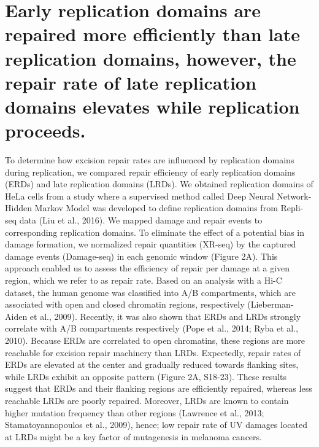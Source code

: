 \section{Early replication domains are repaired more efficiently than late replication domains, however, the repair rate of late replication domains elevates while replication proceeds.}

To determine how excision repair rates are influenced by replication domains during replication, we compared repair efficiency of early replication domains (ERDs) and late replication domains (LRDs). We obtained replication domains of HeLa cells from a study where a supervised method called Deep Neural Network-Hidden Markov Model was developed to define replication domains from Repli-seq data (Liu et al., 2016). We mapped damage and repair events to corresponding replication domains. To eliminate the effect of a potential bias in damage formation, we normalized repair quantities (XR-seq) by the captured damage events (Damage-seq) in each genomic window (Figure 2A). This approach enabled us to assess the efficiency of repair per damage at a given region, which we refer to as repair rate. Based on an analysis with a Hi-C dataset, the human genome was classified into A/B compartments, which are associated with open and closed chromatin regions, respectively (Lieberman-Aiden et al., 2009). Recently, it was also shown that ERDs and LRDs strongly correlate with A/B compartments respectively (Pope et al., 2014; Ryba et al., 2010). Because ERDs are correlated to open chromatins, these regions are more reachable for excision repair machinery than LRDs. Expectedly, repair rates of ERDs are elevated at the center and gradually reduced towards flanking sites, while LRDs exhibit an opposite pattern (Figure 2A, S18-23). These results suggest that ERDs and their flanking regions are efficiently repaired, whereas less reachable LRDs are poorly repaired. Moreover, LRDs are known to contain higher mutation frequency than other regions (Lawrence et al., 2013; Stamatoyannopoulos et al., 2009), hence; low repair rate of UV damages located at LRDs might be a key factor of mutagenesis in melanoma cancers. 
